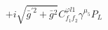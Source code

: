 %
\begin{dmath*}
%
  +  i \sqrt{{\bar g}^{\prime 2} + {\bar g}{}^2}C^{ \varphi  l1}_{f_1 f_2} \gamma^{\mu_5} P_L
%
\end{dmath*}
%

